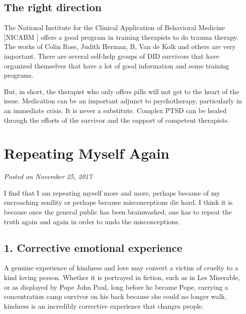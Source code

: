\documentclass[]{book}
\begin{document}
\hypertarget{the-right-direction}{%
\subsection*{The right direction}\label{the-right-direction}}

The National Institute for the Clinical Application of Behavioral Medicine {[}NICABM {]} offers a good program in training therapists to do trauma therapy. The works of Colin Ross, Judith Herman, B, Van de Kolk and others are very important. There are several self-help groups of DID survivors that have organized themselves that have a lot of good information and some training programs.

But, in short, the therapist who only offers pills will not get to the heart of the issue. Medication can be an important adjunct to psychotherapy, particularly in an immediate crisis. It is never a substitute. Complex PTSD can be healed through the efforts of the survivor and the support of competent therapists.

\hypertarget{repeating-myself-again}{%
\section{Repeating Myself Again}\label{repeating-myself-again}}

\emph{Posted on November 25, 2017}

I find that I am repeating myself more and more, perhaps because of my encroaching senility or perhaps because misconceptions die hard. I think it is because once the general public has been brainwashed, one has to repeat the truth again and again in order to undo the misconceptions.

\hypertarget{corrective-emotional-experience}{%
\subsection*{1. Corrective emotional experience}\label{corrective-emotional-experience}}

A genuine experience of kindness and love may convert a victim of cruelty to a kind loving person. Whether it is portrayed in fiction, such as in Les Miserable, or as displayed by Pope John Paul, long before he became Pope, carrying a concentration camp survivor on his back because she could no longer walk, kindness is an incredibly corrective experience that changes people.
\end{document}
